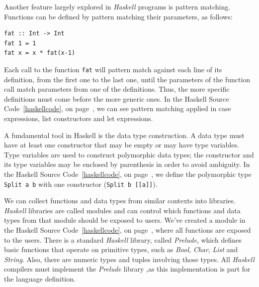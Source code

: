 \documentclass[12pt,twoside]{article}
\numberwithin{spec}{subsection}
\numberwithin{proof}{subsection}
\numberwithin{figure}{subsection}
\numberwithin{code}{subsection}
\newcommand{\citeHaskell}[1]{Haskell Source Code~\ref{#1}, on page~\pageref{#1}}
\begin{document}
Another feature largely explored in \textit{Haskell} programs is pattern matching. Functions can be defined by pattern matching their parameters, as follows:
\begin{verbatim}
fat :: Int -> Int
fat 1 = 1
fat x = x * fat(x-1)
\end{verbatim}

Each call to the function \verb.fat. will pattern match against each line of its definition,  from the first one to the last one, until the parameters of the function call match parameters from one of the definitions. Thus, the more specific definitions must come before the more generic ones. In the \citeHaskell{haskellcode}, we can see pattern matching applied in case expressions, list constructors and let expressions.

A fundamental tool in Haskell is the data type construction. A data type must have at least one constructor that may be empty or may have type variables. Type variables are used to construct polymorphic data types; the constructor and its type variables may be enclosed by parenthesis in order to avoid ambiguity. In the \citeHaskell{haskellcode}, we define the polymorphic type \verb.Split a b. with one constructor (\verb.Split b [[a]].). 

We can collect functions and data types from similar contexts into libraries. \textit{Haskell} libraries are called modules and can control which functions and data types from that module should be exposed to users. We've created a module in the \citeHaskell{haskellcode}, where all functions are exposed to the users. There is a standard \textit{Haskell} library, called \textit{Prelude}, which defines basic functions that operate on primitive types, such as \textit{Bool}, \textit{Char}, \textit{List} and \textit{String}. Also, there are numeric types and tuples involving those types. All \textit{Haskell} compilers must implement the \textit{Prelude} library ,as this implementation is part for the language definition.
\end{document}

